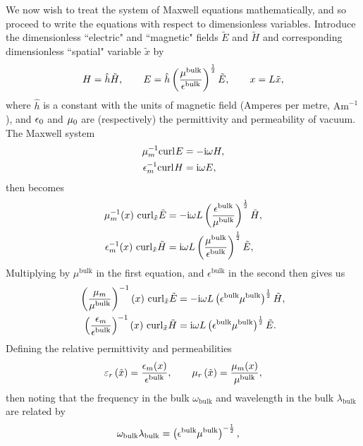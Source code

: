 We now wish to treat the system of Maxwell equations mathematically, and so proceed to write the equations with respect to dimensionless variables.
Introduce the dimensionless ``electric" and ``magnetic" fields $\tilde{E}$ and $\tilde{H}$ and corresponding dimensionless ``spatial" variable $\tilde{x}$ by
\begin{align*}
	H = \hat{h}\tilde{H}, 
	\qquad E = \hat{h}\left( \frac{\mu^{\mathrm{bulk}}}{\epsilon^{\mathrm{bulk}}} \right)^{\frac{1}{2}}\tilde{E},
	\qquad x = L\tilde{x},
\end{align*}
where $\hat{h}$ is a constant with the units of magnetic field (Amperes per metre, $\mathrm{A}\mathrm{m}^{-1}$), and $\epsilon_0$ and $\mu_0$ are (respectively) the permittivity and permeability of vacuum.
The Maxwell system
\begin{align*}
	\mu_m^{-1}\mathrm{curl}_{}E &= -\mathrm{i}\omega H, \\
	\epsilon_m^{-1}\mathrm{curl}_{}H &= \mathrm{i}\omega E,
\end{align*}
then becomes
\begin{align*}
	\mu_m^{-1}(x) \ \mathrm{curl}_{\tilde{x}}\tilde{E} 
	&= -\mathrm{i}\omega L\left( \frac{\epsilon^{\mathrm{bulk}}}{\mu^{\mathrm{bulk}}} \right)^{\frac{1}{2}} \tilde{H}, \\
	\epsilon_m^{-1}(x) \ \mathrm{curl}_{\tilde{x}}\tilde{H} 
	&= \mathrm{i}\omega L\left( \frac{\mu^{\mathrm{bulk}}}{\epsilon^{\mathrm{bulk}}} \right)^{\frac{1}{2}} \tilde{E},
\end{align*}
Multiplying by $\mu^{\mathrm{bulk}}$ in the first equation, and $\epsilon^{\mathrm{bulk}}$ in the second then gives us
\begin{align*}
	\bracs{\frac{\mu_m}{\mu^{\mathrm{bulk}}}}^{-1}(x) \ \curl{\tilde{x}}\tilde{E} 
	&= -\rmi\omega L\bracs{\epsilon^{\mathrm{bulk}}\mu^{\mathrm{bulk}}}^{\recip{2}} \tilde{H}, \\
	\bracs{\frac{\epsilon_m}{\epsilon^{\mathrm{bulk}}}}^{-1}(x) \ \curl{\tilde{x}}\tilde{H} 
	&= \rmi\omega L\bracs{\epsilon^{\mathrm{bulk}}\mu^{\mathrm{bulk}}}^{\recip{2}} \tilde{E}.
\end{align*}
Defining the relative permittivity and permeabilities
\begin{align*}
	\varepsilon_r\left( \tilde{x} \right) = \frac{\epsilon_m(x)}{\epsilon^{\mathrm{bulk}}},
	\qquad \mu_r\left( \tilde{x} \right) = \frac{\mu_m(x)}{\mu^{\mathrm{bulk}}},
\end{align*}
then noting that the frequency in the bulk $\omega_{\mathrm{bulk}}$ and wavelength in the bulk $\lambda_{\mathrm{bulk}}$ are related by 
\begin{align*}
	\omega_{\mathrm{bulk}} \lambda_{\mathrm{bulk}}
	&= \left( \epsilon^{\mathrm{bulk}}\mu^{\mathrm{bulk}} \right)^{-\frac{1}{2}},
\end{align*}
